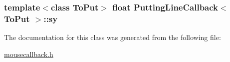 \subsubsection[{sy}]{\setlength{\rightskip}{0pt plus 5cm}template$<$class To\+Put$>$ float {\bf Putting\+Line\+Callback}$<$ To\+Put $>$\+::sy\hspace{0.3cm}{\ttfamily [private]}}\label{classPuttingLineCallback_a92d6e9d843c9022499da9029220b78bd}


The documentation for this class was generated from the following file\+:\begin{DoxyCompactItemize}
\item 
\hyperlink{mousecallback_8h}{mousecallback.\+h}\end{DoxyCompactItemize}
